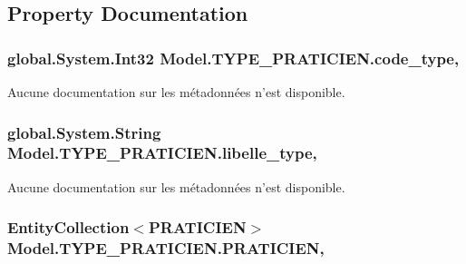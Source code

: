 \subsection{Property Documentation}
\hypertarget{class_model_1_1_t_y_p_e___p_r_a_t_i_c_i_e_n_a48244203401f53911cbb4b3981cd6adc}{
\subsubsection[{code\-\_\-type}]{\setlength{\rightskip}{0pt plus 5cm}global.\-System.\-Int32 Model.\-T\-Y\-P\-E\-\_\-\-P\-R\-A\-T\-I\-C\-I\-E\-N.\-code\-\_\-type\hspace{0.3cm}{\ttfamily [get]}, {\ttfamily [set]}}}\label{class_model_1_1_t_y_p_e___p_r_a_t_i_c_i_e_n_a48244203401f53911cbb4b3981cd6adc}


Aucune documentation sur les métadonnées n'est disponible. 

\hypertarget{class_model_1_1_t_y_p_e___p_r_a_t_i_c_i_e_n_ad800514647304706a6b72928af0e16d3}{
\subsubsection[{libelle\-\_\-type}]{\setlength{\rightskip}{0pt plus 5cm}global.\-System.\-String Model.\-T\-Y\-P\-E\-\_\-\-P\-R\-A\-T\-I\-C\-I\-E\-N.\-libelle\-\_\-type\hspace{0.3cm}{\ttfamily [get]}, {\ttfamily [set]}}}\label{class_model_1_1_t_y_p_e___p_r_a_t_i_c_i_e_n_ad800514647304706a6b72928af0e16d3}


Aucune documentation sur les métadonnées n'est disponible. 

\hypertarget{class_model_1_1_t_y_p_e___p_r_a_t_i_c_i_e_n_a4607a2ba91f71fb88ce4f80a1473f43a}{
\subsubsection[{P\-R\-A\-T\-I\-C\-I\-E\-N}]{\setlength{\rightskip}{0pt plus 5cm}Entity\-Collection$<${\bf P\-R\-A\-T\-I\-C\-I\-E\-N}$>$ Model.\-T\-Y\-P\-E\-\_\-\-P\-R\-A\-T\-I\-C\-I\-E\-N.\-P\-R\-A\-T\-I\-C\-I\-E\-N\hspace{0.3cm}{\ttfamily [get]}, {\ttfamily [set]}}}\label{class_model_1_1_t_y_p_e___p_r_a_t_i_c_i_e_n_a4607a2ba91f71fb88ce4f80a1473f43a}


